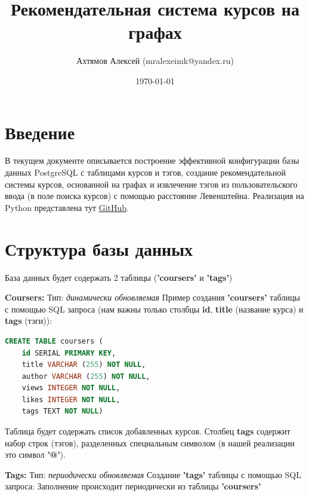 \documentclass[12pt]{article}
\title{Рекомендательная система курсов на графах}
\author{Ахтямов Алексей (mralexeimk@yandex.ru)}
\date{\today}
\begin{document}
\maketitle

\section*{Введение}
В текущем документе описывается построение эффективной конфигурации базы данных PostgreSQL с таблицами курсов и тэгов, создание рекомендательной системы курсов, основанной на графах и извлечение тэгов из пользовательского ввода (в поле поиска курсов) с помощью расстояние Левенштейна. \newline
Реализация на Python представлена тут \href{https://github.com/Yedom/RecomendationSystem}{\color{blue}GitHub}.
\section*{Структура базы данных}
База данных будет содержать 2 таблицы (\textbf{'coursers'} и \textbf{'tags'}) \newline

\noindent \textbf{Coursers:} \newline
Тип: \textit{динамически обновляемая} \newline
Пример создания \textbf{'coursers'} таблицы с помощью SQL запроса (нам важны только столбцы \textbf{id}, \textbf{title} (название курса) и \textbf{tags} (тэги)): \newline

\begin{lstlisting}[language=sql]
CREATE TABLE coursers (
	id SERIAL PRIMARY KEY,
	title VARCHAR (255) NOT NULL,
	author VARCHAR (255) NOT NULL,
	views INTEGER NOT NULL,
	likes INTEGER NOT NULL,
	tags TEXT NOT NULL)
\end{lstlisting}

\noindent Таблица будет содержать список добавленных курсов. \newline
Столбец \textbf{tags} содержит набор строк (тэгов), разделенных специальным символом (в нашей реализации это символ \textbf{'@'}). \newline

\noindent \textbf{Tags:} \newline
Тип: \textit{периодически обновляемая} \newline
Создание \textbf{'tags'} таблицы с помощью SQL запроса: \newline
Заполнение происходит периодически из таблицы \textbf{'coursers'} \newline
\end{document}
